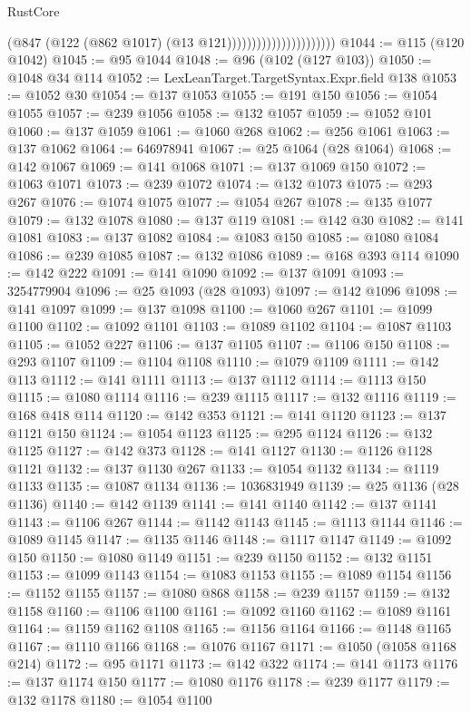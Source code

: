 \begin{lexlean}{RustCore}
\begin{coremodule}
                                          (@847 (@122 (@862 @1017) (@13 @121))))))))))))))))))))))
@1044 := @115 (@120 @1042)
@1045 := @95 @1044
@1048 := @96 (@102 (@127 @103))
@1050 := @1048 @34 @114
@1052 := LexLeanTarget.TargetSyntax.Expr.field @138
@1053 := @1052 @30
@1054 := @137 @1053
@1055 := @191 @150
@1056 := @1054 @1055
@1057 := @239 @1056
@1058 := @132 @1057
@1059 := @1052 @101
@1060 := @137 @1059
@1061 := @1060 @268
@1062 := @256 @1061
@1063 := @137 @1062
@1064 := 646978941
@1067 := @25 @1064 (@28 @1064)
@1068 := @142 @1067
@1069 := @141 @1068
@1071 := @137 @1069 @150
@1072 := @1063 @1071
@1073 := @239 @1072
@1074 := @132 @1073
@1075 := @293 @267
@1076 := @1074 @1075
@1077 := @1054 @267
@1078 := @135 @1077
@1079 := @132 @1078
@1080 := @137 @119
@1081 := @142 @30
@1082 := @141 @1081
@1083 := @137 @1082
@1084 := @1083 @150
@1085 := @1080 @1084
@1086 := @239 @1085
@1087 := @132 @1086
@1089 := @168 @393 @114
@1090 := @142 @222
@1091 := @141 @1090
@1092 := @137 @1091
@1093 := 3254779904
@1096 := @25 @1093 (@28 @1093)
@1097 := @142 @1096
@1098 := @141 @1097
@1099 := @137 @1098
@1100 := @1060 @267
@1101 := @1099 @1100
@1102 := @1092 @1101
@1103 := @1089 @1102
@1104 := @1087 @1103
@1105 := @1052 @227
@1106 := @137 @1105
@1107 := @1106 @150
@1108 := @293 @1107
@1109 := @1104 @1108
@1110 := @1079 @1109
@1111 := @142 @113
@1112 := @141 @1111
@1113 := @137 @1112
@1114 := @1113 @150
@1115 := @1080 @1114
@1116 := @239 @1115
@1117 := @132 @1116
@1119 := @168 @418 @114
@1120 := @142 @353
@1121 := @141 @1120
@1123 := @137 @1121 @150
@1124 := @1054 @1123
@1125 := @295 @1124
@1126 := @132 @1125
@1127 := @142 @373
@1128 := @141 @1127
@1130 := @1126 @1128 @1121
@1132 := @137 @1130 @267
@1133 := @1054 @1132
@1134 := @1119 @1133
@1135 := @1087 @1134
@1136 := 1036831949
@1139 := @25 @1136 (@28 @1136)
@1140 := @142 @1139
@1141 := @141 @1140
@1142 := @137 @1141
@1143 := @1106 @267
@1144 := @1142 @1143
@1145 := @1113 @1144
@1146 := @1089 @1145
@1147 := @1135 @1146
@1148 := @1117 @1147
@1149 := @1092 @150
@1150 := @1080 @1149
@1151 := @239 @1150
@1152 := @132 @1151
@1153 := @1099 @1143
@1154 := @1083 @1153
@1155 := @1089 @1154
@1156 := @1152 @1155
@1157 := @1080 @868
@1158 := @239 @1157
@1159 := @132 @1158
@1160 := @1106 @1100
@1161 := @1092 @1160
@1162 := @1089 @1161
@1164 := @1159 @1162 @1108
@1165 := @1156 @1164
@1166 := @1148 @1165
@1167 := @1110 @1166
@1168 := @1076 @1167
@1171 := @1050 (@1058 @1168 @214)
@1172 := @95 @1171
@1173 := @142 @322
@1174 := @141 @1173
@1176 := @137 @1174 @150
@1177 := @1080 @1176
@1178 := @239 @1177
@1179 := @132 @1178
@1180 := @1054 @1100

\end{coremodule}
\end{lexlean}
